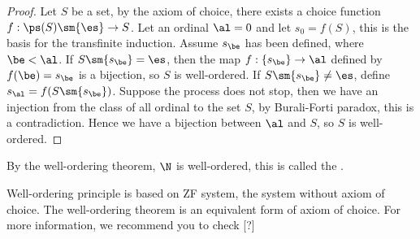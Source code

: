 \documentclass[10pt]{article}
\begin{document}
\begin{proof}
    Let $S$ be a set, by the axiom of choice, there exists a choice function $f:\ps(S)\sm\{\es\}\to S$. Let an ordinal $\al=0$ and let ${s}_{0}=f(S)$, this is the basis for the transfinite induction. Assume ${s}_{\be}$ has been defined, where $\be<\al$. If $S\sm\{{s}_{\be}\}=\es$, then the map $f:\{{s}_{\be}\}\to\al$ defined by $f(\be)={s}_{\be}$ is a bijection, so $S$ is well-ordered. If $S\sm\{{s}_{\be}\}\ne\es$, define ${s}_{\al}=f(S\sm\{{s}_{\be}\})$. Suppose the process does not stop, then we have an injection from the class of all ordinal to the set $S$, by Burali-Forti paradox, this is a contradiction. Hence we have a bijection between $\al$ and $S$, so $S$ is well-ordered.
\end{proof}
By the well-ordering theorem, $\N$ is well-ordered, this is called the .
\begin{remark}
    Well-ordering principle is based on ZF system, the system without axiom of choice. The well-ordering theorem is an equivalent form of axiom of choice. For more information, we recommend you to check [?]
\end{remark}
\end{document}
